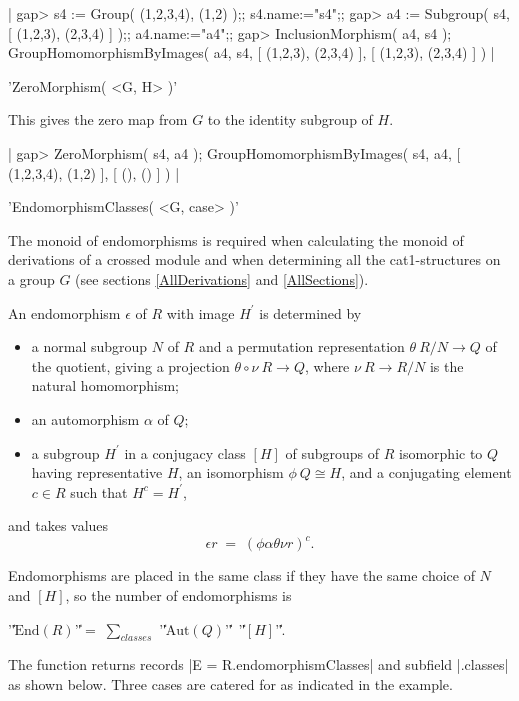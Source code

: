 {|    gap> s4 := Group( (1,2,3,4), (1,2) );; s4.name:="s4";;
    gap> a4 := Subgroup( s4, [ (1,2,3), (2,3,4) ] );; a4.name:="a4";;
    gap> InclusionMorphism( a4, s4 );
    GroupHomomorphismByImages( a4, s4, [ (1,2,3), (2,3,4) ],
      [ (1,2,3), (2,3,4) ] ) |

%

'ZeroMorphism( <G, H> )'

This gives the zero map from  $G$  to the identity subgroup of  $H$.

|    gap> ZeroMorphism( s4, a4 );
    GroupHomomorphismByImages( s4, a4, [ (1,2,3,4), (1,2) ], [ (), () ] ) |

%

'EndomorphismClasses( <G, case> )'

The monoid of endomorphisms is required
when calculating the monoid of derivations of a crossed module and when
determining all the cat1-structures on a group $G$ 
(see sections \ref{AllDerivations} and \ref{AllSections}).

An endomorphism $\epsilon$ of  $R$  with image $H^{\prime}$ is determined by
\begin{itemize}
\item  a normal subgroup $N$ of $R$ and a permutation representation 
       $\theta \: R/N \to Q$  of the quotient,
       giving a projection  $\theta \circ \nu \: R \to Q $,
       where  $\nu \: R \to R/N$  is the natural homomorphism;
\item  an automorphism  $\alpha$  of  $Q$;
\item  a subgroup  $H^{\prime}$  in a conjugacy class  $[H]$
       of subgroups of  $R$
       isomorphic to  $Q$  having representative  $H$,
       an isomorphism  $\phi \: Q \cong H$,
       and a conjugating element  $c \in R$
       such that  $H^c = H^{\prime}$,
\end{itemize}
and takes values
$$\epsilon r \; = \; (\phi \alpha \theta \nu r)^c.$$

Endomorphisms are placed in the same class if they have the same choice
of  $N$  and  $[H]$,  so the number of endomorphisms is
\begin{center}
'\|'$\mathrm{End}(R)$'\|'$ = \; \sum_{classes}$
'\|'$\mathrm{Aut}(Q)$'\|'\ '\|'$[H]$'\|'.
\end{center}
The function returns records 
|E = R.endomorphismClasses|  and subfield  |.classes|  as shown below.
Three cases are catered for as indicated in the example.

}
